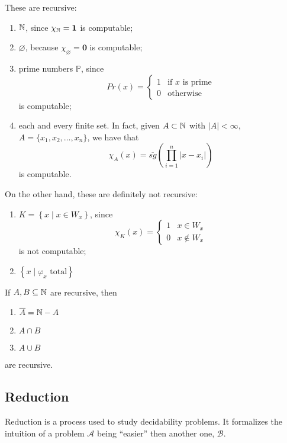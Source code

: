\begin{example}
  These are recursive:
\begin{enumerate}[label=(\alph*)]
\item $\mathbb{N}$, since $\chi_{\mathbb{N}} = \mathbf{1}$ is computable;
\item $\varnothing$, because $\chi_\varnothing = \mathbf{0}$ is computable;
\item prime numbers $\mathbb{P}$, since
  \[
    Pr(x) = \begin{cases}
      1 & \mbox{if $x$ is prime} \\
      0 & \mbox{otherwise}
    \end{cases}
  \]
  is computable;
\item each and every finite set. In fact, given $A \subset \mathbb{N}$ with
  $|A| < \infty$, $A = \{x_1, x_2, \dots, x_n\}$, we have that
  \[
    \chi_A(x) = \overline{sg}\left( \prod_{i=1}^n|x - x_i| \right)
  \]
  is computable.
\end{enumerate}
\end{example}


On the other hand, these are definitely not recursive:
\begin{enumerate}[label=(\alph*)]
\item $K = \left\{ x \; | \; x \in W_x \right\} $, since
  \[
    \chi_{K}(x) = \begin{cases}
      1 & x \in W_x \\
      0 & x \notin W_x
    \end{cases}
  \]
  is not computable;
\item $\left\{ x \; | \; \varphi_x \mbox{ total} \right\} $
\end{enumerate}

\begin{observation}
  If $A,B \subseteq \mathbb{N}$ are recursive, then
\begin{enumerate}[label=\arabic*)]
\item $\overline{A} = \mathbb{N} - A$
\item $A \cap B$
\item $A \cup B$
\end{enumerate}
are recursive.
\end{observation}


\subsection{Reduction}
Reduction is a process used to study decidability
problems. It formalizes the intuition of a problem
$\mathcal{A}$ being ``easier'' then another one, $\mathcal{B}$.

